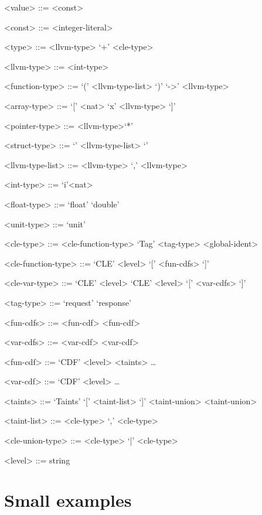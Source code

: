 \documentclass{article}
\begin{document}
\begin{grammar}
<value> ::= <const>

<const> ::= <integer-literal>

<type> ::= <llvm-type> `+' <cle-type>

<llvm-type> ::= <int-type>

<function-type> ::= `(' <llvm-type-list> `)' `->' <llvm-type>

<array-type> ::= `[' <nat> `x' <llvm-type> `]'

<pointer-type> ::= <llvm-type>`*'

<struct-type> ::= `{' <llvm-type-list> `}'

<llvm-type-list> ::= <llvm-type>
`,' <llvm-type>

<int-type> ::= `i'<nat>

<float-type> ::= `float' 
\alt `double'

<unit-type> ::= `unit'

<cle-type> ::= <cle-function-type> 
\alt `Tag' <tag-type> <global-ident>

<cle-function-type> ::= `CLE' <level> `[' <fun-cdfs> `]'

<cle-var-type> ::= `CLE' <level> 
\alt `CLE' <level> `[' <var-cdfs> `]'

<tag-type> ::= `request' 
\alt `response'

<fun-cdfs> ::= <fun-cdf> 
 <fun-cdf>

<var-cdfs> ::= <var-cdf> 
 <var-cdf>

<fun-cdf> ::= `CDF' <level> <taints> \ldots   

<var-cdf> ::= `CDF' <level> \ldots   

<taints> ::= `Taints' `[' <taint-list> `]' <taint-union> <taint-union>

<taint-list> ::= <cle-type>
`,' <cle-type>

<cle-union-type> ::= <cle-type>
 `|' <cle-type> 

<level> ::= string

\end{grammar}

\section{Small examples}
\end{document}
